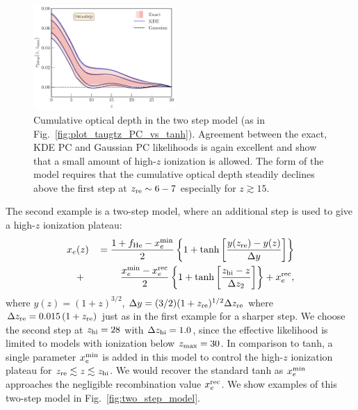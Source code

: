 \documentclass[prd,twocolumn,amsmath,amssymb,floatfix,superscriptaddress,nofootinbib]{revtex4-1}
\newcommand{\zmax}{z_{\rm max}}
\newcommand{\xemin}{x_e^{\rm min}}
\newcommand{\bea}{\begin{eqnarray}}
\newcommand{\eea}{\end{eqnarray}}
\begin{document}
\begin{figure}
\includegraphics[width=0.48\textwidth]
{paper/plots/pl18_taugtz_tanh_highz_direct_vs_kde_vs_gaussian.pdf}
\caption{Cumulative optical depth in the two step model (as in Fig.~\ref{fig:plot_taugtz_PC_vs_tanh}).  Agreement between the exact, KDE PC and Gaussian PC likelihoods is again excellent and show that a small amount of high-$z$ ionization is allowed. The form of the model requires that the cumulative optical depth steadily declines above the first step at $z_{\rm re} \sim 6-7$ especially for $z\gtrsim 15$.
}
\label{fig:plot_taugtz_two_step_contours}
\end{figure}
 
The second example is a two-step model, where an additional step is used to give a high-$z$ ionization plateau: 
 \bea
x_e&(z)&\,= \frac{1+f_{\rm He} - \xemin}{2}\left\{  1+ \tanh\left[ \frac{y(z_{\rm re})-y(z)}{\Delta y} \right] \right\} \notag \\
&+& \frac{\xemin - x_e^{\rm rec}}{2}\left\{  1+ \tanh\left[ \frac{z_{\rm hi}-z}{\Delta z_{2}} \right] \right\} + x_e^{\rm rec},
 \label{eqn:tanh_highz}
 \eea
where $y(z)=(1+z)^{3/2}$, $\Delta y=(3/2)(1+z_{\rm re})^{1/2}\Delta z_{\rm re}$ where $\Delta z_{\rm re} = 0.015\, (1+z_{\rm re})$ just as in the first example for a sharper step.
We choose the second step at $z_{\rm hi}=28$ with $\Delta z_{\rm hi} = 1.0$, since the effective likelihood is limited to models with ionization below $\zmax=30$. 
In comparison to tanh, a single parameter $\xemin$ is added in this model to control the high-$z$ ionization plateau for $z_{\rm re} \lesssim z \lesssim z_{\rm hi}$. We would recover the standard tanh as $\xemin$ approaches the negligible recombination value $x_e^{\rm rec}$. We show examples
of this two-step model in Fig.~\ref{fig:two_step_model}.
\end{document}
